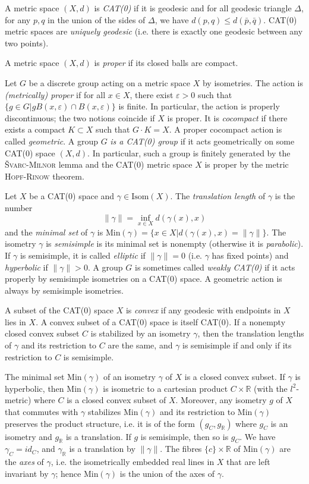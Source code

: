\documentclass  [a4paper, 11pts] {article}
\newcommand{\R}{\mathbb{R}}
\newcommand{\eps}{\varepsilon}
\newcommand{\Min}{{\mathrm{Min}}}
\begin{document}
A metric space $(X, d)$ is \emph{CAT(0)} if it is geodesic and for all geodesic triangle $\Delta$, for any $p, q$ in the union of the sides of $\Delta$, we have $d(p, q) \le d(\bar{p}, \bar{q})$. CAT(0) metric spaces are \emph{uniquely geodesic} (i.e. there is exactly one geodesic between any two points).

A metric space $(X, d)$ is \emph{proper} if its closed balls are compact.

Let $G$ be a discrete group acting on a metric space $X$ by isometries. The action is \emph{(metrically) proper} if for all $x\in X$, there exist $\eps > 0$ such that $\{g\in G | gB(x, \eps)\cap B(x, \eps)\}$ is finite. In particular, the action is properly discontinuous; the two notions coincide if $X$ is proper. It is \emph{cocompact} if there exists a compact $K\subset X$ such that $G\cdot K = X$. A proper cocompact action is called \emph{geometric}. A group $G$ \emph{is a CAT(0) group} if it acts geometrically on some CAT(0) space $(X, d)$. In particular, such a group is finitely generated by the \textsc{Švarc-Milnor} lemma and the CAT(0) metric space $X$ is proper by the metric \textsc{Hopf-Rinow} theorem.

Let $X$ be a CAT(0) space and $\gamma\in \mathrm{Isom}(X)$. The \emph{translation length} of $\gamma$ is the number
\[\|\gamma\| = \inf_{x\in X} d(\gamma(x), x)\]
and the \emph{minimal set} of $\gamma$ is $\Min(\gamma) = \{x\in X | d(\gamma(x), x) = \|\gamma\|\}$. The isometry $\gamma$ is \emph{semisimple} is its minimal set is nonempty (otherwise it is \emph{parabolic}). If $\gamma$ is semisimple, it is called \emph{elliptic} if $\|\gamma\| = 0$ (i.e. $\gamma$ has fixed points) and \emph{hyperbolic} if $\|\gamma\| > 0$. A group $G$ is sometimes called \emph{weakly CAT(0)} if it acts properly by semisimple isometries on a CAT(0) space. A geometric action is always by semisimple isometries.

A subset of the CAT(0) space $X$ is \emph{convex} if any geodesic with endpoints in $X$ lies in $X$. A convex subset of a CAT(0) space is itself CAT(0). If a nonempty closed convex subset $C$ is stabilized by an isometry $\gamma$, then the translation lengths of $\gamma$ and its restriction to $C$ are the same, and $\gamma$ is semisimple if and only if its restriction to $C$ is semisimple.

The minimal set $\Min(\gamma)$ of an isometry $\gamma$ of $X$ is a closed convex subset. If $\gamma$ is hyperbolic, then $\Min(\gamma)$ is isometric to a cartesian product $C\times \R$ (with the $l^2$-metric) where $C$ is a closed convex subset of $X$. Moreover, any isometry $g$ of $X$ that commutes with $\gamma$ stabilizes $\Min(\gamma)$ and its restriction to $\Min(\gamma)$ preserves the product structure, i.e. it is of the form $(g_C, g_\R)$ where $g_C$ is an isometry and $g_\R$ is a translation. If $g$ is semisimple, then so is $g_C$. We have $\gamma_C = id_C$, and $\gamma_\R$ is a translation by $\|\gamma\|$. The fibres $\{c\}\times\R$ of $\Min(\gamma)$ are the \emph{axes} of $\gamma$, i.e. the isometrically embedded real lines in $X$ that are left invariant by $\gamma$; hence $\Min(\gamma)$ is the union of the axes of $\gamma$.
\end{document}

